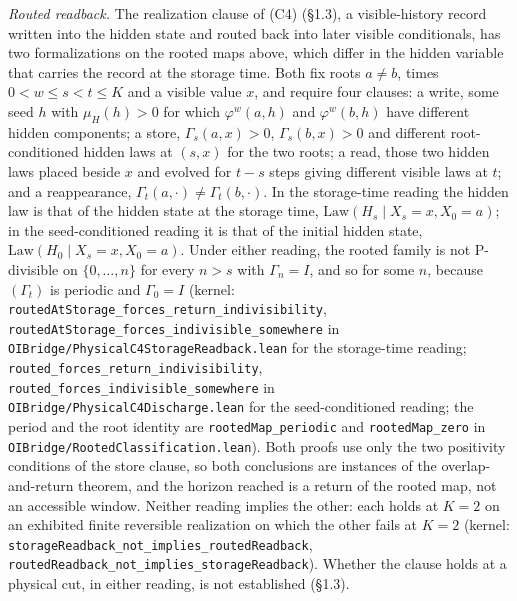 \documentclass[
]{article}
\begin{document}
\emph{Routed readback.} The realization clause of (C4) (§1.3), a
visible-history record written into the hidden state and routed back
into later visible conditionals, has two formalizations on the rooted
maps above, which differ in the hidden variable that carries the record
at the storage time. Both fix roots \(a \neq b\), times
\(0 < w \leq s < t \leq K\) and a visible value \(x\), and require four
clauses: a write, some seed \(h\) with \(\mu_H(h) > 0\) for which
\(\varphi^w(a, h)\) and \(\varphi^w(b, h)\) have different hidden
components; a store, \(\Gamma_s(a, x) > 0\), \(\Gamma_s(b, x) > 0\) and
different root-conditioned hidden laws at \((s, x)\) for the two roots;
a read, those two hidden laws placed beside \(x\) and evolved for
\(t - s\) steps giving different visible laws at \(t\); and a
reappearance, \(\Gamma_t(a, \cdot) \neq \Gamma_t(b, \cdot)\). In the
storage-time reading the hidden law is that of the hidden state at the
storage time, \(\mathrm{Law}(H_s \mid X_s = x, X_0 = a)\); in the
seed-conditioned reading it is that of the initial hidden state,
\(\mathrm{Law}(H_0 \mid X_s = x, X_0 = a)\). Under either reading, the
rooted family is not P-divisible on \(\{0, \ldots, n\}\) for every
\(n > s\) with \(\Gamma_n = I\), and so for some \(n\), because
\((\Gamma_t)\) is periodic and \(\Gamma_0 = I\) (kernel:
\texttt{routedAtStorage\_forces\_return\_indivisibility},
\texttt{routedAtStorage\_forces\_indivisible\_somewhere} in
\texttt{OIBridge/PhysicalC4StorageReadback.lean} for the storage-time
reading; \texttt{routed\_forces\_return\_indivisibility},
\texttt{routed\_forces\_indivisible\_somewhere} in
\texttt{OIBridge/PhysicalC4Discharge.lean} for the seed-conditioned
reading; the period and the root identity are
\texttt{rootedMap\_periodic} and \texttt{rootedMap\_zero} in
\texttt{OIBridge/RootedClassification.lean}). Both proofs use only the
two positivity conditions of the store clause, so both conclusions are
instances of the overlap-and-return theorem, and the horizon reached is
a return of the rooted map, not an accessible window. Neither reading
implies the other: each holds at \(K = 2\) on an exhibited finite
reversible realization on which the other fails at \(K = 2\) (kernel:
\texttt{storageReadback\_not\_implies\_routedReadback},
\texttt{routedReadback\_not\_implies\_storageReadback}). Whether the
clause holds at a physical cut, in either reading, is not established
(§1.3).
\end{document}
